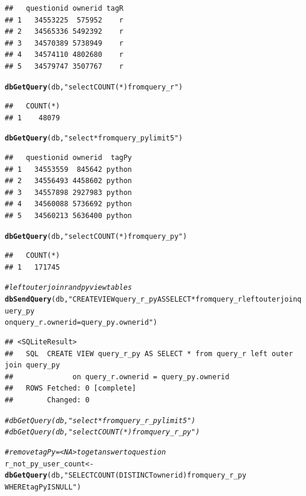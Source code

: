 \documentclass{article}\usepackage[]{graphicx}\usepackage[]{color}
\makeatletter
\newcommand{\hlstr}[1]{\textcolor[rgb]{0.192,0.494,0.8}{#1}}%
\newcommand{\hlcom}[1]{\textcolor[rgb]{0.678,0.584,0.686}{\textit{#1}}}%
\newcommand{\hlstd}[1]{\textcolor[rgb]{0.345,0.345,0.345}{#1}}%
\newcommand{\hlkwb}[1]{\textcolor[rgb]{0.69,0.353,0.396}{#1}}%
\newcommand{\hlkwd}[1]{\textcolor[rgb]{0.737,0.353,0.396}{\textbf{#1}}}%
\newenvironment{kframe}{%
 \def\at@end@of@kframe{}%
 \ifinner\ifhmode%
  \def\at@end@of@kframe{\end{minipage}}%
  \begin{minipage}{\columnwidth}%
 \fi\fi%
 \def\FrameCommand##1{\hskip\@totalleftmargin \hskip-\fboxsep
 \colorbox{shadecolor}{##1}\hskip-\fboxsep
     \hskip-\linewidth \hskip-\@totalleftmargin \hskip\columnwidth}%
 \MakeFramed {\advance\hsize-\width
   \@totalleftmargin\z@ \linewidth\hsize
   \@setminipage}}%
 {\par\unskip\endMakeFramed%
 \at@end@of@kframe}
\newenvironment{knitrout}{}{} %
\makeatother
\begin{document}
\begin{knitrout}
\begin{kframe}
{\ttfamily\noindent\color{warningcolor}{\#\# Warning: Closing open result set, pending rows}}\begin{verbatim}
##   questionid ownerid tagR
## 1   34553225  575952    r
## 2   34565336 5492392    r
## 3   34570389 5738949    r
## 4   34574110 4802680    r
## 5   34579747 3507767    r
\end{verbatim}
\begin{alltt}
\hlkwd{dbGetQuery}\hlstd{(db,} \hlstr{"select COUNT(*) from query_r"}\hlstd{)}
\end{alltt}
\begin{verbatim}
##   COUNT(*)
## 1    48079
\end{verbatim}
\begin{alltt}
\hlkwd{dbGetQuery}\hlstd{(db,} \hlstr{"select * from query_py limit 5"}\hlstd{)}
\end{alltt}
\begin{verbatim}
##   questionid ownerid  tagPy
## 1   34553559  845642 python
## 2   34556493 4458602 python
## 3   34557898 2927983 python
## 4   34560088 5736692 python
## 5   34560213 5636400 python
\end{verbatim}
\begin{alltt}
\hlkwd{dbGetQuery}\hlstd{(db,} \hlstr{"select COUNT(*) from query_py"}\hlstd{)}
\end{alltt}
\begin{verbatim}
##   COUNT(*)
## 1   171745
\end{verbatim}
\begin{alltt}
\hlcom{#left outer join r and py view tables}
\hlkwd{dbSendQuery}\hlstd{(db,} \hlstr{"CREATE VIEW query_r_py AS SELECT * from query_r left outer join query_py
             on query_r.ownerid = query_py.ownerid"}\hlstd{)}
\end{alltt}
\begin{verbatim}
## <SQLiteResult>
##   SQL  CREATE VIEW query_r_py AS SELECT * from query_r left outer join query_py
##              on query_r.ownerid = query_py.ownerid
##   ROWS Fetched: 0 [complete]
##        Changed: 0
\end{verbatim}
\begin{alltt}
\hlcom{#dbGetQuery(db, "select * from query_r_py limit 5")}
\hlcom{#dbGetQuery(db, "select COUNT(*) from query_r_py")}

\hlcom{#remove tagPy = <NA> to get answer to question}
\hlstd{r_not_py_user_count} \hlkwb{<-} \hlkwd{dbGetQuery}\hlstd{(db,} \hlstr{"SELECT COUNT (DISTINCT ownerid) from query_r_py 
                WHERE tagPy IS NULL"}\hlstd{)}
\end{alltt}



\end{kframe}
\end{knitrout}
\end{document}
